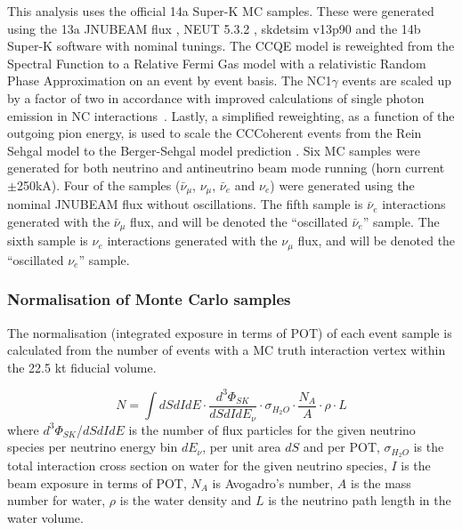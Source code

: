 This analysis uses the official 14a Super-K MC samples. These were generated using the 13a JNUBEAM flux \cite{FluxTuning13a,FluxTuning13a_second}, 
NEUT 5.3.2 \cite{neut_version}, 
skdetsim v13p90 and the 14b Super-K software \cite{SuperkMC14a} with nominal tunings. The CCQE model is reweighted 
from the Spectral Function to a Relative Fermi Gas model with a relativistic Random Phase Approximation on an event by 
event basis. The NC1$\gamma$ events are scaled up by a factor of two in accordance with improved calculations of single 
photon emission in NC interactions~\cite{NCGamma}. Lastly, a simplified reweighting, as a function of the outgoing pion energy, 
is used to scale the CCCoherent events from the Rein Sehgal model to the Berger-Sehgal model prediction \cite{NIWGCCQE,NIWG_reccomandation}.   
Six MC samples were generated for both neutrino and antineutrino beam 
mode running (horn current $\pm$250kA). Four of the samples ($\bar{\nu}_{\mu}$, $\nu_{\mu}$, $\bar{\nu}_{e}$ and $\nu_{e}$) 
were generated using the nominal JNUBEAM flux without oscillations.
The fifth sample is $\bar{\nu}_{e}$ interactions generated with the $\bar{\nu}_{\mu}$ flux, and will be denoted the 
``oscillated $\bar{\nu}_{e}$'' sample. 
The sixth sample is $\nu_{e}$ interactions generated with the $\nu_{\mu}$ flux, 
and will be denoted the ``oscillated $\nu_{e}$'' sample.

\subsubsection {Normalisation of Monte Carlo samples}
\label{sec:mc_templates:normalization}

The normalisation (integrated exposure in terms of POT) of each event sample is calculated from
the number of events with a MC truth interaction vertex within the 22.5 kt fiducial volume.

\begin{equation}
\displaystyle
  N = \int  dS dI dE \cdot
            \frac{d^{3}\Phi_{SK}}{dS dI dE_{\nu}} \cdot
            \sigma_{H_{2}O} \cdot
            \frac{N_{A}}{A} \cdot \rho \cdot L 
\end{equation}
where 
$d^{3}\Phi_{SK}$/$dS dI dE$ is the number of flux particles for the given neutrino species 
per neutrino energy bin $dE_{\nu}$, per unit area $dS$ and per POT,
$\sigma_{H_{2}O}$ is the total interaction cross section on water
for the given neutrino species,
$I$ is the beam exposure in terms of POT,
$N_{A}$ is  Avogadro's number,
$A$ is the mass number for water,
$\rho$ is the water density
and $L$ is the neutrino path length in the water volume.

